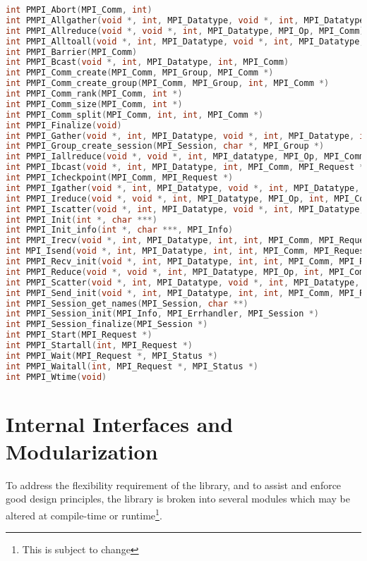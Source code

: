\documentclass{article}
\begin{document}
\begin{lstlisting}[language=C]
int PMPI_Abort(MPI_Comm, int)
int PMPI_Allgather(void *, int, MPI_Datatype, void *, int, MPI_Datatype, MPI_Comm)
int PMPI_Allreduce(void *, void *, int, MPI_Datatype, MPI_Op, MPI_Comm)
int PMPI_Alltoall(void *, int, MPI_Datatype, void *, int, MPI_Datatype, MPI_Comm)
int PMPI_Barrier(MPI_Comm)
int PMPI_Bcast(void *, int, MPI_Datatype, int, MPI_Comm)
int PMPI_Comm_create(MPI_Comm, MPI_Group, MPI_Comm *)
int PMPI_Comm_create_group(MPI_Comm, MPI_Group, int, MPI_Comm *)
int PMPI_Comm_rank(MPI_Comm, int *)
int PMPI_Comm_size(MPI_Comm, int *)
int PMPI_Comm_split(MPI_Comm, int, int, MPI_Comm *)
int PMPI_Finalize(void)
int PMPI_Gather(void *, int, MPI_Datatype, void *, int, MPI_Datatype, int, MPI_Comm)
int PMPI_Group_create_session(MPI_Session, char *, MPI_Group *)
int PMPI_Iallreduce(void *, void *, int, MPI_datatype, MPI_Op, MPI_Comm, MPI_Request *)
int PMPI_Ibcast(void *, int, MPI_Datatype, int, MPI_Comm, MPI_Request *)
int PMPI_Icheckpoint(MPI_Comm, MPI_Request *)
int PMPI_Igather(void *, int, MPI_Datatype, void *, int, MPI_Datatype, int, MPI_Comm, MPI_Request *)
int PMPI_Ireduce(void *, void *, int, MPI_Datatype, MPI_Op, int, MPI_Comm, MPI_Request *)
int PMPI_Iscatter(void *, int, MPI_Datatype, void *, int, MPI_Datatype, int, MPI_Comm, MPI_Request *)
int PMPI_Init(int *, char ***)
int PMPI_Init_info(int *, char ***, MPI_Info)
int PMPI_Irecv(void *, int, MPI_Datatype, int, int, MPI_Comm, MPI_Request *)
int MPI_Isend(void *, int, MPI_Datatype, int, int, MPI_Comm, MPI_Request *)
int PMPI_Recv_init(void *, int, MPI_Datatype, int, int, MPI_Comm, MPI_Request *)
int PMPI_Reduce(void *, void *, int, MPI_Datatype, MPI_Op, int, MPI_Comm)
int PMPI_Scatter(void *, int, MPI_Datatype, void *, int, MPI_Datatype, int, MPI_Comm)
int PMPI_Send_init(void *, int, MPI_Datatype, int, int, MPI_Comm, MPI_Request *)
int PMPI_Session_get_names(MPI_Session, char **)
int PMPI_Session_init(MPI_Info, MPI_Errhandler, MPI_Session *)
int PMPI_Session_finalize(MPI_Session *)
int PMPI_Start(MPI_Request *)
int PMPI_Startall(int, MPI_Request *)
int PMPI_Wait(MPI_Request *, MPI_Status *)
int PMPI_Waitall(int, MPI_Request *, MPI_Status *)
int PMPI_Wtime(void)

\end{lstlisting}

\section{Internal Interfaces and Modularization}

To address the flexibility requirement of the library, and to assist and enforce good design principles, the library is broken into several modules which may be altered at compile-time or runtime\footnote{This is subject to change}.  
\end{document}
